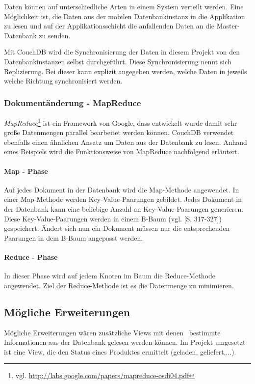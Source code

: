 Daten können auf unterschiedliche Arten in einem System verteilt werden. Eine
	Möglichkeit ist, die Daten aus der mobilen Datenbankinstanz in die Applikation
	zu lesen und auf der Applikationsschicht die anfallenden Daten an die
	Master-Datenbank zu senden.

Mit CouchDB wird die Synchronisierung der Daten in diesem Projekt von den
	Datenbankinstanzen selbst durchgeführt. Diese Synchronisierung nennt sich 
	Replizierung. Bei dieser kann explizit angegeben werden, welche Daten
	in jeweils welche Richtung synchronisiert werden.

\subsubsection{Dokumentänderung - MapReduce}

\emph{MapReduce}\footnote{vgl. \url{http://labs.google.com/papers/mapreduce-osdi04.pdf}}
	ist ein Framework von Google, dass entwickelt wurde damit sehr große
	Datenmengen parallel bearbeitet werden können. CouchDB verwendet ebenfalls
	einen ähnlichen Ansatz um Daten aus der Datenbank zu lesen. Anhand eines
	Beispiels wird die Funktionsweise von MapReduce nachfolgend erläutert.

\paragraph{Map - Phase} Auf jedes Dokument in der Datenbank wird die Map-Methode
	angewendet. In einer Map-Methode werden Key-Value-Paarungen gebildet. Jedes
	Dokument in der Datenbank kann eine beliebige Anzahl an Key-Value-Paarungen
	generieren. Diese Key-Value-Paarungen werden in einem B-Baum (vgl.
	\cite{Ottmann96}[S. 317-327]) gespeichert. Ändert sich nun ein Dokument müssen
	nur die entsprechenden Paarungen in	dem B-Baum angepasst werden. 

\paragraph{Reduce - Phase} In dieser Phase wird auf jedem Knoten im Baum die
	Reduce-Methode angewendet. Ziel der Reduce-Methode ist es die Datenmenge zu
	minimieren.

\subsection{Mögliche Erweiterungen}

Mögliche Erweiterungen wären zusätzliche Views mit denen  bestimmte Informationen
	aus der Datenbank gelesen werden können. Im Projekt umgesetzt ist eine View,
	die den Status eines Produktes ermittelt (geladen, geliefert,...). 
	
